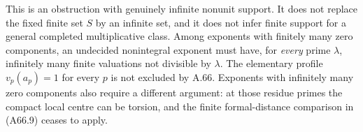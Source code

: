 This is an obstruction with genuinely
infinite nonunit support. It does not
replace the fixed finite set $S$ by an
infinite set, and it does not infer
finite support for a general completed
multiplicative class. Among exponents
with finitely many zero components,
an undecided nonintegral exponent must
have, for \emph{every} prime $\lambda$,
infinitely many finite valuations not
divisible by $\lambda$. The elementary
profile $v_p(a_p)=1$ for every $p$ is
not excluded by A.66. Exponents with
infinitely many zero components also
require a different argument: at those
residue primes the compact local
centre can be torsion, and the finite
formal-distance comparison in
(A66.9) ceases to apply.
